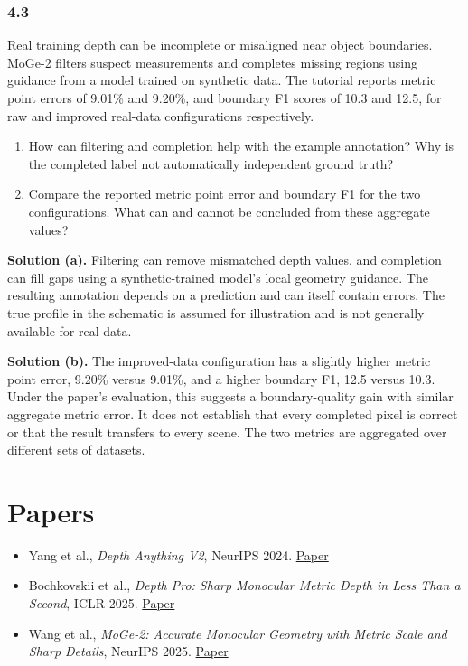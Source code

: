\documentclass[11pt,a4paper]{article}
\begin{document}
\begin{minipage}{\linewidth}
\subsubsection*{4.3}
Real training depth can be incomplete or misaligned near object boundaries.
MoGe-2 filters suspect measurements and completes missing regions using guidance from a model trained on synthetic data.
The tutorial reports metric point errors of 9.01\% and 9.20\%, and boundary F1 scores of 10.3 and 12.5, for raw and improved real-data configurations respectively.
\begin{enumerate}[label=(\alph*),nosep]
\item How can filtering and completion help with the example annotation?
Why is the completed label not automatically independent ground truth?
\item Compare the reported metric point error and boundary F1 for the two configurations.
What can and cannot be concluded from these aggregate values?
\end{enumerate}
\ifsolutions
\noindent\textbf{Solution (a).}
Filtering can remove mismatched depth values, and completion can fill gaps using a synthetic-trained model's local geometry guidance.
The resulting annotation depends on a prediction and can itself contain errors.
The true profile in the schematic is assumed for illustration and is not generally available for real data.

\noindent\textbf{Solution (b).}
The improved-data configuration has a slightly higher metric point error, 9.20\% versus 9.01\%, and a higher boundary F1, 12.5 versus 10.3.
Under the paper's evaluation, this suggests a boundary-quality gain with similar aggregate metric error.
It does not establish that every completed pixel is correct or that the result transfers to every scene.
The two metrics are aggregated over different sets of datasets.
\fi
\end{minipage}
\par\medskip
\section*{Papers}
\begin{itemize}[nosep]
\item Yang et al., \emph{Depth Anything V2}, NeurIPS 2024.
\href{https://arxiv.org/abs/2406.09414}{Paper}
\item Bochkovskii et al., \emph{Depth Pro: Sharp Monocular Metric Depth in Less Than a Second}, ICLR 2025.
\href{https://arxiv.org/abs/2410.02073}{Paper}
\item Wang et al., \emph{MoGe-2: Accurate Monocular Geometry with Metric Scale and Sharp Details}, NeurIPS 2025.
\href{https://arxiv.org/abs/2507.02546}{Paper}
\end{itemize}
\end{document}
